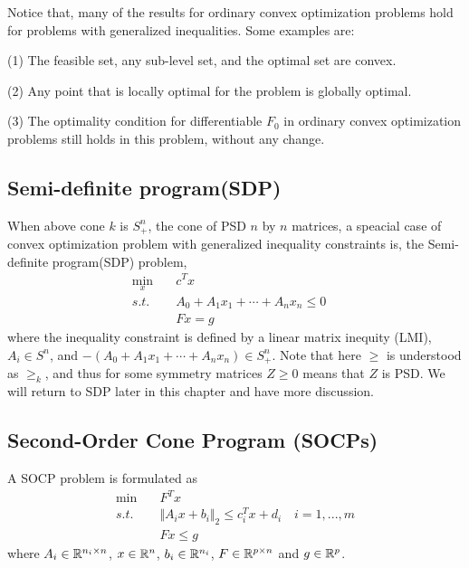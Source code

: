 Notice that, many of the results for ordinary convex optimization problems hold for problems with generalized inequalities. Some examples are:

(1) The feasible set, any sub-level set, and the optimal set are convex.

(2) Any point that is locally optimal for the problem is globally optimal.

(3) The optimality condition for differentiable $F_0$ in ordinary convex optimization problems still holds in this problem, without any change.


\vspace{0.3cm}
\subsection{Semi-definite program(SDP)}
When above cone $k$ is $S^n_+$, the cone of PSD $n$ by $n$ matrices, a speacial case of convex optimization problem with generalized inequality constraints is, the Semi-definite program(SDP) problem,
\begin{align*}
\min_x\quad & c^Tx \\
s.t.\quad & A_0+A_1x_1+\cdots+A_nx_n\leq 0\quad \\
& Fx = g
\end{align*}
where the inequality constraint is defined by a linear matrix inequity (LMI), $A_i\in S^n$, and $-(A_0+A_1x_1+\cdots+A_nx_n)\in S^n_+$. Note that here $\geq$ is understood as $\geq_k$, and thus for some symmetry matrices $Z\geq 0$ means that $Z$ is PSD. We will return to SDP later in this chapter and have more discussion.









\subsection{Second-Order Cone Program (SOCPs)}
A SOCP problem is formulated as
\begin{align*}
\min \quad&F^Tx\\
s.t. \quad& \Vert A_ix+b_i\Vert_2 \leq c_i^Tx + d_i\quad i = 1,...,m\\
&Fx \leq g
\end{align*}
where $A_i\in \mathbb{R}^{n_i\times n}$, $x\in \mathbb{R}^n$, $b_i\in \mathbb{R}^{n_i}$, $F\in \mathbb{R}^{p\times n}$ and $g\in \mathbb{R}^p$.

